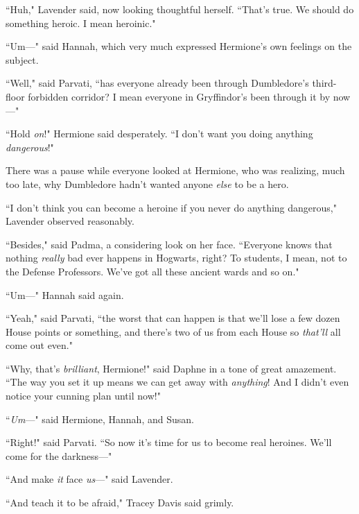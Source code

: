 ``Huh," Lavender said, now looking thoughtful herself. ``That's true. We should do something heroic. I mean heroinic."

``Um---" said Hannah, which very much expressed Hermione's own feelings on the subject.

``Well," said Parvati, ``has everyone already been through Dumbledore's third-floor forbidden corridor? I mean everyone in Gryffindor's been through it by now---"

``Hold \emph{on}!" Hermione said desperately. ``I don't want you doing anything \emph{dangerous}!"

There was a pause while everyone looked at Hermione, who was realizing, much too late, why Dumbledore hadn't wanted anyone \emph{else} to be a hero.

``I don't think you can become a heroine if you never do anything dangerous," Lavender observed reasonably.

``Besides," said Padma, a considering look on her face. ``Everyone knows that nothing \emph{really} bad ever happens in Hogwarts, right? To students, I mean, not to the Defense Professors. We've got all these ancient wards and so on."

``Um---" Hannah said again.

``Yeah," said Parvati, ``the worst that can happen is that we'll lose a few dozen House points or something, and there's two of us from each House so \emph{that'll} all come out even."

``Why, that's \emph{brilliant}, Hermione!" said Daphne in a tone of great amazement. ``The way you set it up means we can get away with \emph{anything}! And I didn't even notice your cunning plan until now!"

``\emph{Um}---" said Hermione, Hannah, and Susan.

``Right!" said Parvati. ``So now it's time for us to become real heroines. We'll come for the darkness---"

``And make \emph{it} face \emph{us}---" said Lavender.

``And teach it to be afraid," Tracey Davis said grimly.

